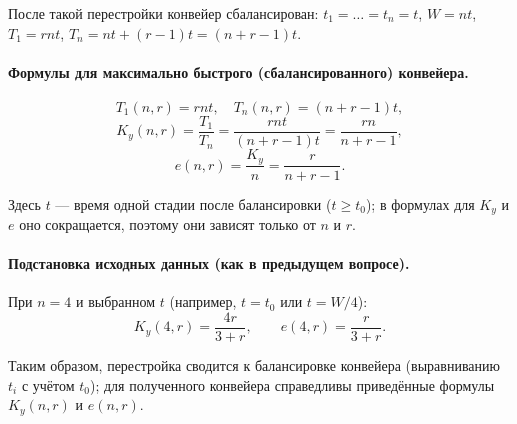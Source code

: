 После такой перестройки конвейер сбалансирован: $t_1 = \ldots = t_n = t$, $W = n t$, $T_1 = r n t$, $T_n = n t + (r - 1) t = (n + r - 1) t$.

\paragraph{Формулы для максимально быстрого (сбалансированного) конвейера.}
\[
\boxed{
T_1(n, r) = r n t, \quad T_n(n, r) = (n + r - 1) t,
}
\]
\[
\boxed{
K_y(n, r) = \frac{T_1}{T_n} = \frac{r n t}{(n + r - 1) t} = \frac{r n}{n + r - 1},
}
\]
\[
\boxed{
e(n, r) = \frac{K_y}{n} = \frac{r}{n + r - 1}.
}
\]

Здесь $t$ — время одной стадии после балансировки ($t \geq t_0$); в формулах для $K_y$ и $e$ оно сокращается, поэтому они зависят только от $n$ и $r$.

\paragraph{Подстановка исходных данных (как в предыдущем вопросе).}
При $n = 4$ и выбранном $t$ (например, $t = t_0$ или $t = W/4$):
\[
K_y(4, r) = \frac{4r}{3 + r}, \qquad e(4, r) = \frac{r}{3 + r}.
\]

Таким образом, перестройка сводится к балансировке конвейера (выравниванию $t_i$ с учётом $t_0$); для полученного конвейера справедливы приведённые формулы $K_y(n, r)$ и $e(n, r)$.
